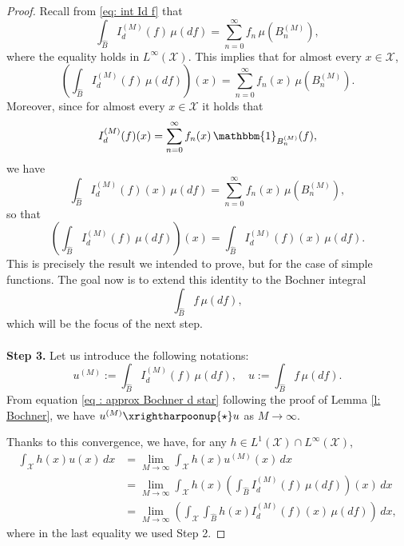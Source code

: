 \documentclass[a4paper, 11pt]{article}
\theoremstyle{definition}
\newcommand{\cX}{{\mathcal{X}}}
\begin{document}
{\begin{proof}
	Recall from \eqref{eq: int Id f} that
	\[
	\int_{\widehat{B}} I_d^{(M)}(f) \, \mu(df) = \sum_{n=0}^\infty f_n \, \mu\left(B_n^{(M)}\right),
	\]
	where the equality holds in \( L^\infty(\cX) \). This implies that for almost every \( x \in \cX \),
	\[
	\left( \int_{\widehat{B}} I_d^{(M)}(f) \, \mu(df) \right)(x) = \sum_{n=0}^\infty f_n(x) \, \mu\left(B_n^{(M)}\right).
	\]
	Moreover, since for almost every \( x \in \cX \) it holds that
	\[
	I_d^{(M)}(f)(x) = \sum_{n=0}^\infty f_n(x) \, \mathbbm{1}_{B_n^{(M)}}(f),
	\]
	we have
	\[
	\int_{\widehat{B}} I_d^{(M)}(f)(x) \, \mu(df) = \sum_{n=0}^\infty f_n(x) \, \mu\left(B_n^{(M)}\right),
	\]
	so that
	\[
	\left( \int_{\widehat{B}} I_d^{(M)}(f) \, \mu(df) \right)(x) = \int_{\widehat{B}} I_d^{(M)}(f)(x) \, \mu(df).
	\]
	This is precisely the result we intended to prove, but for the case of simple functions. The goal now is to extend this identity to the Bochner integral
	\[
	\int_{\widehat{B}} f \, \mu(df),
	\]
	which will be the focus of the next step. %
	\\
	\\
	\textbf{Step 3.} Let us introduce the following notations:
	\[
	u^{(M)} := \int_{\widehat{B}} I_d^{(M)}(f) \, \mu(df) ,  \quad u:= \int_{\widehat{B}} f \, \mu(df).
	\]
	From equation \eqref{eq : approx Bochner d star} following the proof of Lemma \ref{l: Bochner}, we have $u^{(M)} \xrightharpoonup{\star} u$ as $M \rightarrow \infty$.
%	
%	

Thanks to this convergence, we have, for any \( h \in L^1(\cX) \cap L^\infty(\cX) \),
	\begin{align}\nonumber
		\int_{\cX} h(x) u(x) \, dx 
		&= \lim_{M \rightarrow \infty} \int_{\cX} h(x) u^{(M)}(x) \, dx \\
	\nonumber
		&= \lim_{M \rightarrow \infty} \int_{\cX} h(x) \left( \int_{\widehat{B}} I_d^{(M)}(f) \, \mu(df) \right)(x) \, dx \\
		\label{eq : h scalaire u proof prop eval}
		&= \lim_{M \rightarrow \infty} \left( \int_{\cX} \int_{\widehat{B}} h(x) I_d^{(M)}(f)(x) \, \mu(df)\right) \, dx,
	\end{align}
	where in the last equality we used Step 2.
	

\end{proof}}
\end{document}
